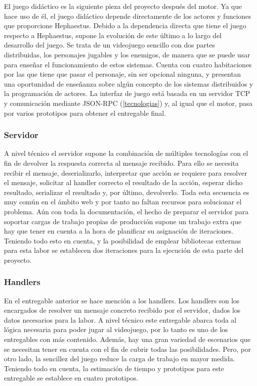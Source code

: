 El juego didáctico es la siguiente pieza del proyecto después del motor. Ya que hace uso de él, el juego didáctico depende directamente de los actores y funciones que proporcione Hephaestus. Debido a la dependencia directa que tiene el juego respecto a Hephaestus, supone la evolución de este último a lo largo del desarrollo del juego. Se trata de un videojuego sencillo con dos partes distribuidas, los personajes jugables y los enemigos, de manera que se puede usar para enseñar el funcionamiento de estos sistemas. Cuenta con cuatro habitaciones por las que tiene que pasar el personaje, sin ser opcional ninguna, y presentan una oportunidad de enseñanza sobre algún concepto de los sistemas distribuidos y la programación de actores. La interfaz de juego está basada en un servidor TCP y comunicación mediante JSON-RPC (\ref{tecnologias}) y, al igual que el motor, pasa por varios prototipos para obtener el entregable final.

\subsubsection{Servidor}

A nivel técnico el servidor supone la combinación de múltiples tecnologías con el fin de devolver la respuesta correcta al mensaje recibido. Para ello se necesita recibir el mensaje, deserializarlo, interpretar que acción se requiere para resolver el mensaje, solicitar al handler correcto el resultado de la acción, esperar dicho resultado, serializar el resultado y, por último, devolverlo. Toda esta secuencia es muy común en el ámbito web y por tanto no faltan recursos para solucionar el problema. Aún con toda la documentación, el hecho de preparar el servidor para soportar cargas de trabajo propias de producción supone un trabajo extra que hay que tener en cuenta a la hora de planificar su asignación de iteraciones. Teniendo todo esto en cuenta, y la posibilidad de emplear bibliotecas externas para esta labor se establecen dos iteraciones para la ejecución de esta parte del proyecto.

\subsubsection{Handlers}

En el entregable anterior se hace mención a los handlers. Los handlers son los encargados de resolver un mensaje concreto recibido por el servidor, dados los datos necesarios para la labor. A nivel técnico este entregable abarca toda al lógica necesaria para poder jugar al videojuego, por lo tanto es uno de los entregables con más contenido. Además, hay una gran variedad de escenarios que se necesitan tener en cuenta con el fin de cubrir todas las posibilidades. Pero, por otro lado, la sencillez del juego reduce la carga de trabajo en mayor medida. Teniendo todo en cuenta, la estimación de tiempo y prototipos para este entregable se establece en cuatro prototipos. 

